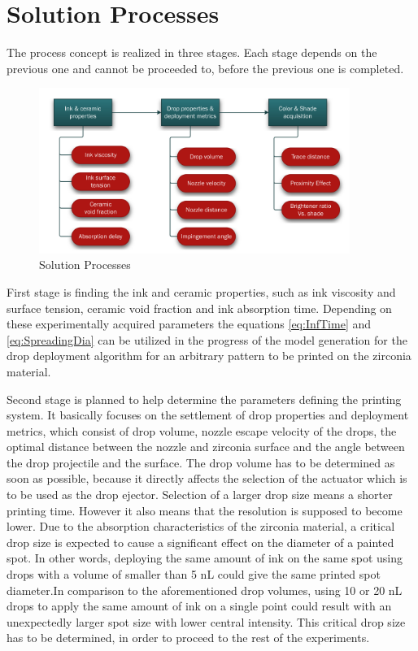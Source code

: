 \chapter{Solution Processes}
\label{sec:Lösungsprozesse}
The process concept is realized in three stages. Each stage depends on the previous one and cannot be proceeded to, before the previous one is completed.

\bigskip

\begin{figure}[H]
	\centering
	\includegraphics[width=0.9\textwidth]{grafiken/SolutionProcesses.jpg}
	\caption{Solution Processes}
	\label{fig:SolutionProcesses}
\end{figure} 

\bigskip


 First stage is finding the ink and ceramic properties, such as ink viscosity and surface tension, ceramic void fraction and ink absorption time. Depending on these experimentally acquired parameters the equations \ref{eq:InfTime} and \ref{eq:SpreadingDia} can be utilized  in the progress of the model generation for the drop deployment algorithm for an arbitrary pattern to be printed on the zirconia material. 
 
 Second stage is planned to help determine the parameters defining the printing system. It basically focuses on the settlement of drop properties and deployment metrics, which consist of drop volume, nozzle escape velocity of the drops, the optimal distance between the nozzle and zirconia surface and the angle between the drop projectile and the surface. The drop volume has to be determined as soon as possible, because it directly affects the selection of the actuator which is to be used as the drop ejector. Selection of a larger drop size means a shorter printing time. However it also means that the resolution is supposed to become lower. Due to the absorption characteristics of the zirconia material, a critical drop size is expected to cause a significant effect on the diameter of a painted spot. In other words, deploying the same amount of ink on the same spot using drops with a volume of smaller than 5 nL could give the same printed spot diameter.In comparison to the aforementioned drop volumes, using  10 or 20 nL drops to apply the same amount of ink on a single point could result with an unexpectedly larger spot size with lower central intensity. This critical drop size has to be determined, in order to proceed to the rest of the experiments.  
 
